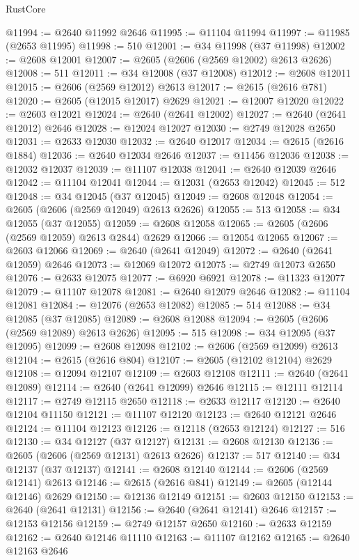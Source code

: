 \begin{lexlean}{RustCore}
\begin{coremodule}
@11994 := @2640 @11992 @2646
@11995 := @11104 @11994
@11997 := @11985 (@2653 @11995)
@11998 := 510
@12001 := @34 @11998 (@37 @11998)
@12002 := @2608 @12001
@12007 := @2605 (@2606 (@2569 @12002) @2613 @2626)
@12008 := 511
@12011 := @34 @12008 (@37 @12008)
@12012 := @2608 @12011
@12015 := @2606 (@2569 @12012) @2613
@12017 := @2615 (@2616 @781)
@12020 := @2605 (@12015 @12017) @2629
@12021 := @12007 @12020
@12022 := @2603 @12021
@12024 := @2640 (@2641 @12002)
@12027 := @2640 (@2641 @12012) @2646
@12028 := @12024 @12027
@12030 := @2749 @12028 @2650
@12031 := @2633 @12030
@12032 := @2640 @12017
@12034 := @2615 (@2616 @1884)
@12036 := @2640 @12034 @2646
@12037 := @11456 @12036
@12038 := @12032 @12037
@12039 := @11107 @12038
@12041 := @2640 @12039 @2646
@12042 := @11104 @12041
@12044 := @12031 (@2653 @12042)
@12045 := 512
@12048 := @34 @12045 (@37 @12045)
@12049 := @2608 @12048
@12054 := @2605 (@2606 (@2569 @12049) @2613 @2626)
@12055 := 513
@12058 := @34 @12055 (@37 @12055)
@12059 := @2608 @12058
@12065 := @2605 (@2606 (@2569 @12059) @2613 @2844) @2629
@12066 := @12054 @12065
@12067 := @2603 @12066
@12069 := @2640 (@2641 @12049)
@12072 := @2640 (@2641 @12059) @2646
@12073 := @12069 @12072
@12075 := @2749 @12073 @2650
@12076 := @2633 @12075
@12077 := @6920 @6921
@12078 := @11323 @12077
@12079 := @11107 @12078
@12081 := @2640 @12079 @2646
@12082 := @11104 @12081
@12084 := @12076 (@2653 @12082)
@12085 := 514
@12088 := @34 @12085 (@37 @12085)
@12089 := @2608 @12088
@12094 := @2605 (@2606 (@2569 @12089) @2613 @2626)
@12095 := 515
@12098 := @34 @12095 (@37 @12095)
@12099 := @2608 @12098
@12102 := @2606 (@2569 @12099) @2613
@12104 := @2615 (@2616 @804)
@12107 := @2605 (@12102 @12104) @2629
@12108 := @12094 @12107
@12109 := @2603 @12108
@12111 := @2640 (@2641 @12089)
@12114 := @2640 (@2641 @12099) @2646
@12115 := @12111 @12114
@12117 := @2749 @12115 @2650
@12118 := @2633 @12117
@12120 := @2640 @12104 @11150
@12121 := @11107 @12120
@12123 := @2640 @12121 @2646
@12124 := @11104 @12123
@12126 := @12118 (@2653 @12124)
@12127 := 516
@12130 := @34 @12127 (@37 @12127)
@12131 := @2608 @12130
@12136 := @2605 (@2606 (@2569 @12131) @2613 @2626)
@12137 := 517
@12140 := @34 @12137 (@37 @12137)
@12141 := @2608 @12140
@12144 := @2606 (@2569 @12141) @2613
@12146 := @2615 (@2616 @841)
@12149 := @2605 (@12144 @12146) @2629
@12150 := @12136 @12149
@12151 := @2603 @12150
@12153 := @2640 (@2641 @12131)
@12156 := @2640 (@2641 @12141) @2646
@12157 := @12153 @12156
@12159 := @2749 @12157 @2650
@12160 := @2633 @12159
@12162 := @2640 @12146 @11110
@12163 := @11107 @12162
@12165 := @2640 @12163 @2646

\end{coremodule}
\end{lexlean}
